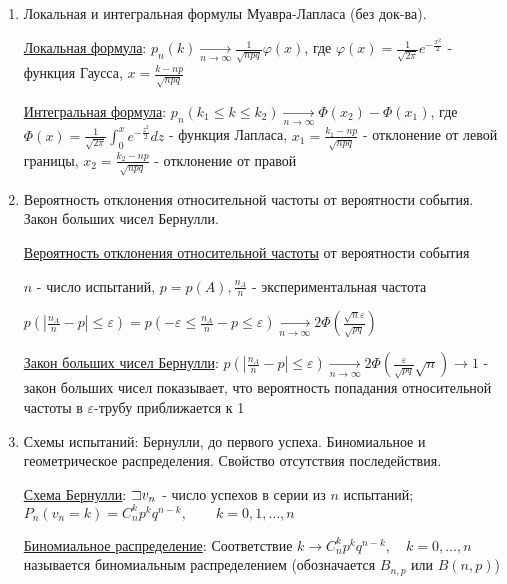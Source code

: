\documentclass[12pt]{article}
\begin{document}
\begin{enumerate}
    \item Локальная и интегральная формулы Муавра-Лапласа (без док-ва).

    \hyperlink{localformulademoivrelaplace}{Локальная формула}: $p_n(k) \underset{n \to \infty}{\longrightarrow} \frac{1}{\sqrt{npq}} \varphi(x)$, где $\varphi(x) = \frac{1}{\sqrt{2\pi}} e^{-\frac{x^2}{2}}$ - функция Гаусса, 
    $x = \frac{k - np}{\sqrt{npq}}$

    \hyperlink{integralformulademoivrelaplace}{Интегральная формула}: $p_n(k_1 \leq k \leq k_2) \underset{n \to \infty}{\longrightarrow} \Phi(x_2) - \Phi(x_1)$, где $\Phi(x) = \frac{1}{\sqrt{2\pi}} \int_0^x e^{-\frac{z^2}{2}} dz$ - функция Лапласа,
    $x_1 = \frac{k_1 - np}{\sqrt{npq}}$ - отклонение от левой границы, $x_2 = \frac{k_2 - np}{\sqrt{npq}}$ - отклонение от правой

    \item Вероятность отклонения относительной частоты от вероятности события. Закон больших чисел Бернулли.

    \hyperlink{probabilityofdeviation}{Вероятность отклонения относительной частоты} от вероятности события

    $n$ - число испытаний, $p = p(A), \frac{n_A}{n}$ - экспериментальная частота

    $p\left(|\frac{n_A}{n} - p| \leq \varepsilon\right) = p\left(-\varepsilon \leq \frac{n_A}{n} - p \leq \varepsilon\right) \underset{n \to \infty}{\longrightarrow} 2\Phi\left(\frac{\sqrt{n}\varepsilon}{\sqrt{pq}}\right)$

    \hyperlink{lawofbignumbersbernoulli}{Закон больших чисел Бернулли}: $p\left(|\frac{n_A}{n} - p| \leq \varepsilon\right) \underset{n \to \infty}{\longrightarrow} 2 \Phi\left(\frac{\varepsilon}{\sqrt{pq}}\sqrt{n}\right) \to 1$ - 
    закон больших чисел показывает, что вероятность попадания относительной частоты в $\varepsilon$-трубу приближается к 1

    \item Схемы испытаний: Бернулли, до первого успеха. Биномиальное и геометрическое распределения. Свойство отсутствия последействия.

    \hyperlink{bernoullischema2}{Схема Бернулли}: $\mathord{\sqsupset} v_n$ - число успехов в серии из $n$ испытаний; 
    $P_n(v_n = k) = C^k_n p^k q^{n - k}, \quad\quad k = 0, 1, \dots, n$

    \hyperlink{binomialdistribution}{Биномиальное распределение}: Соответствие $k \rightarrow C^k_n p^k q^{n - k}, \quad k = 0, \dots, n$ называется биномиальным распределением
    (обозначается $B_{n,p}$ или $B(n, p)$)


\end{enumerate}
\end{document}
